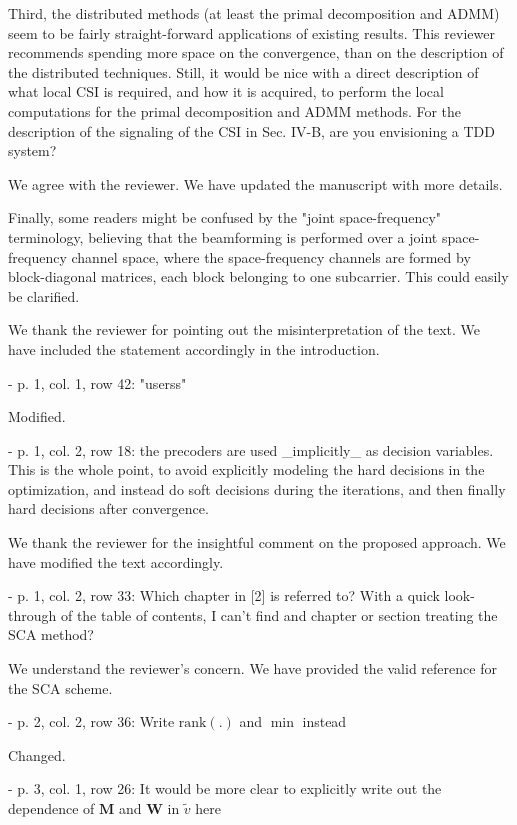  Third, the distributed methods (at least the primal decomposition and ADMM) seem to be fairly straight-forward applications of existing results. This reviewer recommends spending more space on the convergence, than on the description of the distributed techniques. Still, it would be nice with a direct description of what local CSI is required, and how it is acquired, to perform the local computations for the primal decomposition and ADMM methods. For the description of the signaling of the CSI in Sec. IV-B, are you envisioning a TDD system?

\resp We agree with the reviewer. We have updated the manuscript with more details. 

 Finally, some readers might be confused by the "joint space-frequency" terminology, believing that the beamforming is performed over a joint space-frequency channel space, where the space-frequency channels are formed by block-diagonal matrices, each block belonging to one subcarrier. This could easily be clarified. 

\resp We thank the reviewer for pointing out the misinterpretation of the text. We have included the statement accordingly in the introduction.

 - p. 1, col. 1, row 42: "userss"

\resp Modified.

 - p. 1, col. 2, row 18: the precoders are used \_implicitly\_ as decision variables. This is the whole point, to avoid explicitly modeling the hard decisions in the optimization, and instead do soft decisions during the iterations, and then finally hard decisions after convergence.

\resp We thank the reviewer for the insightful comment on the proposed approach. We have modified the text accordingly.

 - p. 1, col. 2, row 33: Which chapter in [2] is referred to? With a quick look-through of the table of contents, I can't find and chapter or section treating the SCA method?

\resp We understand the reviewer's concern. We have provided the valid reference for the SCA scheme.

 - p. 2, col. 2, row 36: Write $\text{rank}(.)$ and $\min$ instead

\resp Changed.

 - p. 3, col. 1, row 26: It would be more clear to explicitly write out the dependence of $\mathbf{M}$ and $\mathbf{W}$ in $\tilde{v}$ here

